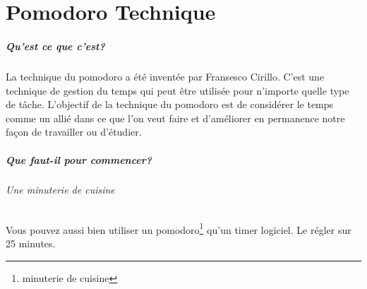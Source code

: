 \chapter{Pomodoro Technique}\label{annexe:pomodoro}

\paragraph*{Qu'est ce que c'est?}La technique du pomodoro a été inventée par Fransesco Cirillo. C'est une technique de gestion du temps qui peut être utilisée pour n'importe quelle type de tâche. L'objectif de la technique du pomodoro est de considérer le temps comme un allié dans ce que l'on veut faire et d'améliorer en permanence notre façon de travailler ou d'étudier.

\paragraph*{Que faut-il pour commencer?}
\subparagraph*{Une minuterie de cuisine}
Vous pouvez aussi bien utiliser un pomodoro\footnote{minuterie de cuisine} qu'un timer logiciel. Le régler sur 25 minutes.
